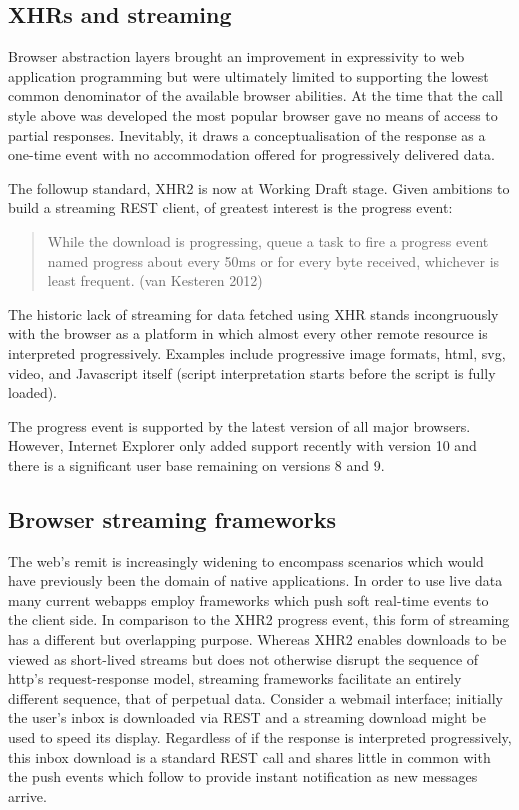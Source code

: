 \documentclass[]{article}
\begin{document}
\subsection{XHRs and streaming}

\label{xhrsandstreaming}

Browser abstraction layers brought an improvement in expressivity to web
application programming but were ultimately limited to supporting the
lowest common denominator of the available browser abilities. At the
time that the call style above was developed the most popular browser
gave no means of access to partial responses. Inevitably, it draws a
conceptualisation of the response as a one-time event with no
accommodation offered for progressively delivered data.

The followup standard, XHR2 is now at Working Draft stage. Given
ambitions to build a streaming REST client, of greatest interest is the
progress event:

\begin{quote}
While the download is progressing, queue a task to fire a progress event
named progress about every 50ms or for every byte received, whichever is
least frequent. (van Kesteren 2012)
\end{quote}

The historic lack of streaming for data fetched using XHR stands
incongruously with the browser as a platform in which almost every other
remote resource is interpreted progressively. Examples include
progressive image formats, html, svg, video, and Javascript itself
(script interpretation starts before the script is fully loaded).

The progress event is supported by the latest version of all major
browsers. However, Internet Explorer only added support recently with
version 10 and there is a significant user base remaining on versions 8
and 9.

\subsection{Browser streaming frameworks}

\label{browserstreamingframeworks}

The web's remit is increasingly widening to encompass scenarios which
would have previously been the domain of native applications. In order
to use live data many current webapps employ frameworks which push soft
real-time events to the client side. In comparison to the XHR2 progress
event, this form of streaming has a different but overlapping purpose.
Whereas XHR2 enables downloads to be viewed as short-lived streams but
does not otherwise disrupt the sequence of http's request-response
model, streaming frameworks facilitate an entirely different sequence,
that of perpetual data. Consider a webmail interface; initially the
user's inbox is downloaded via REST and a streaming download might be
used to speed its display. Regardless of if the response is interpreted
progressively, this inbox download is a standard REST call and shares
little in common with the push events which follow to provide instant
notification as new messages arrive.
\end{document}
